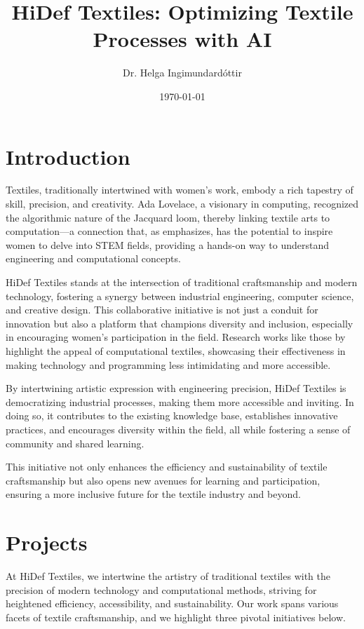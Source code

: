 \documentclass{article}
\title{HiDef Textiles: Optimizing Textile Processes with AI}
\author{Dr. Helga Ingimundardóttir}
\date{\today}
\begin{document}
    \maketitle

    \section{Introduction}

    Textiles, traditionally intertwined with women's work, embody a rich tapestry of skill, precision, and creativity.
    Ada Lovelace, a visionary in computing, recognized the algorithmic nature of the Jacquard loom, thereby linking
    textile arts to computation—a connection that, as \citet{sadieplant} emphasizes, has the potential to inspire women
    to delve into STEM fields, providing a hands-on way to understand engineering and computational concepts.

    HiDef Textiles stands at the intersection of traditional craftsmanship and modern technology, fostering a synergy
    between industrial engineering, computer science, and creative design. This collaborative initiative is not just a
    conduit for innovation but also a platform that champions diversity and inclusion, especially in encouraging
    women's participation in the field. Research works like those by \citet{qiu2013,keune2022} highlight the appeal
    of computational textiles, showcasing their effectiveness in making technology and programming less intimidating
    and more accessible.

    By intertwining artistic expression with engineering precision, HiDef Textiles is democratizing industrial
    processes, making them more accessible and inviting. In doing so, it contributes to the existing knowledge base,
    establishes innovative practices, and encourages diversity within the field, all while fostering a sense of
    community and shared learning.

    This initiative not only enhances the efficiency and sustainability of textile craftsmanship but also opens new
    avenues for learning and participation, ensuring a more inclusive future for the textile industry and beyond.


    \section{Projects}
    At HiDef Textiles, we intertwine the artistry of traditional textiles with the precision of modern technology and
    computational methods, striving for heightened efficiency, accessibility, and sustainability. Our work spans various
    facets of textile craftsmanship, and we highlight three pivotal initiatives below.
\end{document}
